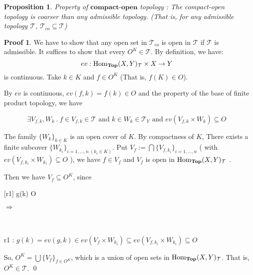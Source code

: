 \documentclass[a4paper]{article}
\theoremstyle{plain}
\newtheorem{prop}[thm]{Proposition}
\theoremstyle{definition}
\newtheorem*{prf}{Proof}
\theoremstyle{remark}
\newcommand{\mc}[1]{\mathcal{#1}}
\newcommand{\mbf}[1]{\mathbf{#1}}
\newcommand{\mcT}{\mc T}
\newcommand{\E}{\exists}
\DeclareMathOperator{\Homtop}{\rm{Hom}_{\mbf{Top}}}
\begin{document}
    \begin{prop}
        Property of $\mbf{compact\text{-}open}$ topology : The compact-open topology
        is coarser than any admissible topology.
        (That is, for any admissible topology $\mcT$, $\mcT_{co} \subseteq \mcT$)
    \end{prop}
    \begin{prf}
        We have to show that any open set in $\mcT_{co}$ is open in $\mcT$ if $\mcT$ is admissible.
        It suffices to show that every $O^K \in \mcT$. By definition, we have:
        $$ ev : \Homtop(X,Y)_{\mcT} \times X \to Y $$
        is continuous. Take $k \in K$ and $f \in O^K$ (That is, $f(K) \in O$).
        \par By $ev$ is continuous,
        $ ev(f, k) = f(k) \in O$ and the property of the base of finite product topology,
        we have

        $$
        \E V_{f,k}, W_k \ .\ 
        f \in V_{f,k} \in \mcT \text{ and } k \in W_k \in \mcT_Y \text{ and } ev(V_{f,k} \times W_k) \subseteq O
        $$

        \par The family $\{W_k\}_{k \in K}$ is an open cover of $K$. By compactness of $K$,
        There exists a finite subcover $\{W_{k_i}\}_{i=1,\dots ,n\ (k_i \in K)}$. Put
        $V_f := \bigcap \{ V_{f,k_i} \}_{i=1,\dots ,n} $ ( with $ev(V_{f,k_i} \times W_{k_i}) \subseteq O$ ), we have $f \in V_f$
        and $V_f$ is open in $\Homtop(X,Y)_{\mcT}$ .
        \par Then we have $V_f \subseteq O^K$, since \\
        \begin{center}
        \begin{prooftree}
            \infer1{ \E k_i \in K \ . \ k \in W_{k_i} }
            [r1]{ g(k) \in O }
        \end{prooftree}
        $\Rightarrow$
        \begin{prooftree}
        \end{prooftree}
        \ \\
        \ \\
        r1 : $g(k)=ev(g,k) \in ev(V_f \times W_{k_i}) \subseteq ev(V_{f,k_i} \times W_{k_i}) \subseteq O $\\
        \end{center}
        
        
        So, $O^K = \bigcup \{V_f\}_{f \in O^K}$, which is a union of open sets in $\Homtop(X,Y)_{\mcT}$.
        That is, $O^K \in \mcT$. 
        \qed
    \end{prf}
\end{document}
